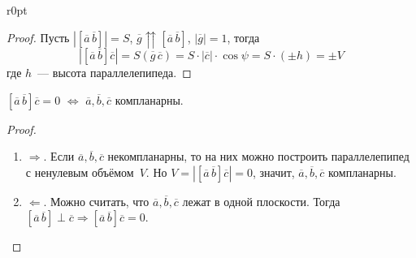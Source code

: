 \noindent\begin{wrapfigure}{r}{0pt}\noindent
{}
\end{wrapfigure}
\begin{proof}
Пусть $|[\overline a\,\overline b]| = S$, $\overline g \upuparrows [\overline a\,\overline b]$, $|\overline g| = 1$, тогда
\begin{equation*}
|[\overline a\,\overline b] \overline c| =
S(\overline g\,\overline c) =
S \cdot |\overline c| \cdot \cos \psi =
S \cdot (\pm h) = \pm V
\end{equation*}
где $h$~--- высота параллелепипеда.
\end{proof}

\begin{statement}
$[\overline a\,\overline b] \overline c = 0$ $\Leftrightarrow$ $\overline a, \overline b, \overline c$ компланарны.
\end{statement}
\begin{proof}
\begin{enumerate}
	\item $\Rightarrow$. Если $\overline a, \overline b, \overline c$ некомпланарны, то на них можно построить параллелепипед с ненулевым объёмом~$V$.
	Но $V = |[\overline a\,\overline b] \overline c| = 0$, значит, $\overline a, \overline b, \overline c$ компланарны.
	
	\item $\Leftarrow$. Можно считать, что $\overline a, \overline b, \overline c$ лежат в одной плоскости.
	Тогда $[\overline a\,\overline b] \perp \overline c \Rightarrow
	[\overline a\,\overline b] \overline c = 0$.
\end{enumerate}
\end{proof}

